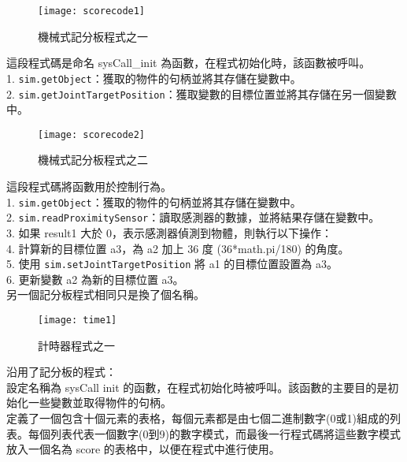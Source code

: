 \begin{figure}[hbt!]
\begin{center}
\texttt{[image: scorecode1]}
\caption{\Large 機械式記分板程式之一}\label{機械式記分板程式之一}
\end{center}
\end{figure} 
這段程式碼是命名 sysCall_init 為函數，在程式初始化時，該函數被呼叫。\\
1. \texttt{sim.getObject}：獲取的物件的句柄並將其存儲在變數中。\\
2. \texttt{sim.getJointTargetPosition}：獲取變數的目標位置並將其存儲在另一個變數中。\\
\newpage

\begin{figure}[hbt!]
\begin{center}
\texttt{[image: scorecode2]}
\caption{\Large 機械式記分板程式之二}\label{機械式記分板程式之二}
\end{center}
\end{figure} 
這段程式碼將函數用於控制行為。\\
1. \texttt{sim.getObject}：獲取的物件的句柄並將其存儲在變數中。\\
2. \texttt{sim.readProximitySensor}：讀取感測器的數據，並將結果存儲在變數中。\\
3. 如果 result1 大於 0，表示感測器偵測到物體，則執行以下操作：\\
4. 計算新的目標位置 a3，為 a2 加上 36 度 (36*math.pi/180) 的角度。\\
5. 使用 \texttt{sim.setJointTargetPosition} 將 a1 的目標位置設置為 a3。\\
6. 更新變數 a2 為新的目標位置 a3。\\
另一個記分板程式相同只是換了個名稱。\\
\newpage

\begin{figure}[hbt!]
\begin{center}
\texttt{[image: time1]}
\caption{\Large 計時器程式之一}\label{計時器程式之一}
\end{center}
\end{figure} 
沿用了記分板的程式：\\
設定名稱為 sysCall init 的函數，在程式初始化時被呼叫。該函數的主要目的是初始化一些變數並取得物件的句柄。\\定義了一個包含十個元素的表格，每個元素都是由七個二進制數字(0或1)組成的列表。每個列表代表一個數字(0到9)的數字模式，而最後一行程式碼將這些數字模式放入一個名為 score 的表格中，以便在程式中進行使用。\\
\newpage

